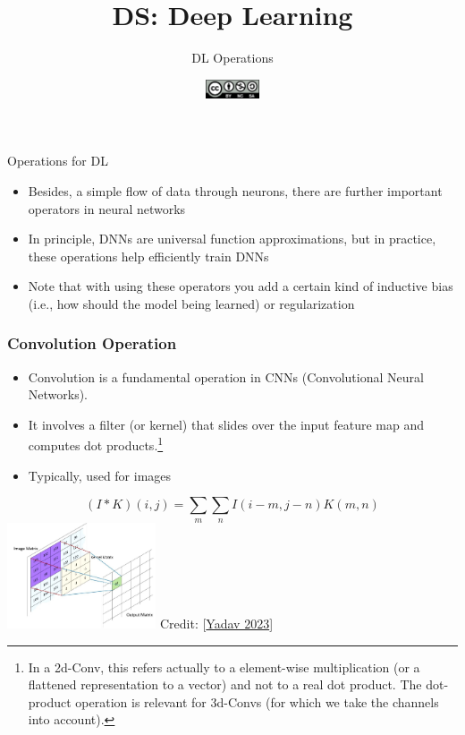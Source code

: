 \documentclass[aspectratio=169]{../latex_main/tntbeamer}  %
\title[DL: DL Operations]{DS: Deep Learning}
\subtitle{DL Operations}
\date{\hspace{0.5em} {\includegraphics[height=1.5em]{../latex_main/figures/Cc-by-nc-sa_icon.svg.png}}}
\begin{document}
	
	\maketitle

    \begin{frame}{Operations for DL}
        \begin{itemize}
            \item Besides, a simple flow of data through neurons, there are further important operators in neural networks
            \item In principle, DNNs are universal function approximations, but in practice, these operations help efficiently train DNNs
            \item Note that with using these operators you add a certain kind of inductive bias (i.e., how should the model being learned) or regularization 
        \end{itemize}
    \end{frame}
 
    \begin{frame}
    \frametitle{Convolution Operation}
    \vspace*{-2em}
    \begin{itemize}
        \item Convolution is a fundamental operation in CNNs (Convolutional Neural Networks).
        \item It involves a filter (or kernel) that slides over the input feature map and computes dot products.\footnote{In a 2d-Conv, this refers actually to a element-wise multiplication (or a flattened representation to a vector) and not to a real dot product. The dot-product operation is relevant for 3d-Convs (for which we take the channels into account).}
        \item Typically, used for images
    \end{itemize}
    \begin{equation}
        (I * K)(i,j) = \sum_{m}\sum_{n} I(i-m,j-n)K(m,n)
    \end{equation}
        \centering
            \includegraphics[width=0.33\textwidth]{figure/convolution.jpg}
        Credit: [\href{https://www.linkedin.com/pulse/image-processing-convolution-filters-calculation-gradients-yadav/}{Yadav 2023}]
    \end{frame}
    
\end{document}
